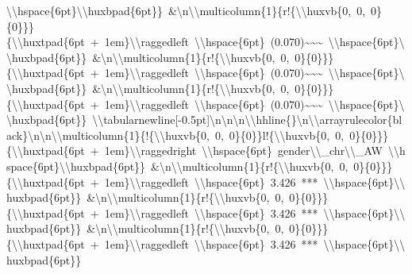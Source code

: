 \documentclass[
  english,
  man]{apa6}
\begin{document}
\textbackslash{}\textbackslash{}hspace\{6pt\}\textbackslash{}\textbackslash{}huxbpad\{6pt\}\}\ \&\textbackslash{}n\textbackslash{}\textbackslash{}multicolumn\{1\}\{r!\{\textbackslash{}\textbackslash{}huxvb\{0,\ 0,\ 0\}\{0\}\}\}\{\textbackslash{}\textbackslash{}huxtpad\{6pt\ +\ 1em\}\textbackslash{}\textbackslash{}raggedleft\ \textbackslash{}\textbackslash{}hspace\{6pt\}\ (0.070)\textasciitilde{}\textasciitilde{}\textasciitilde{}\ \textbackslash{}\textbackslash{}hspace\{6pt\}\textbackslash{}\textbackslash{}huxbpad\{6pt\}\}\ \&\textbackslash{}n\textbackslash{}\textbackslash{}multicolumn\{1\}\{r!\{\textbackslash{}\textbackslash{}huxvb\{0,\ 0,\ 0\}\{0\}\}\}\{\textbackslash{}\textbackslash{}huxtpad\{6pt\ +\ 1em\}\textbackslash{}\textbackslash{}raggedleft\ \textbackslash{}\textbackslash{}hspace\{6pt\}\ (0.070)\textasciitilde{}\textasciitilde{}\textasciitilde{}\ \textbackslash{}\textbackslash{}hspace\{6pt\}\textbackslash{}\textbackslash{}huxbpad\{6pt\}\}\ \&\textbackslash{}n\textbackslash{}\textbackslash{}multicolumn\{1\}\{r!\{\textbackslash{}\textbackslash{}huxvb\{0,\ 0,\ 0\}\{0\}\}\}\{\textbackslash{}\textbackslash{}huxtpad\{6pt\ +\ 1em\}\textbackslash{}\textbackslash{}raggedleft\ \textbackslash{}\textbackslash{}hspace\{6pt\}\ (0.070)\textasciitilde{}\textasciitilde{}\textasciitilde{}\ \textbackslash{}\textbackslash{}hspace\{6pt\}\textbackslash{}\textbackslash{}huxbpad\{6pt\}\}\ \textbackslash{}\textbackslash{}tabularnewline{[}-0.5pt{]}\textbackslash{}n\textbackslash{}n\textbackslash{}n\textbackslash{}\textbackslash{}hhline\{\}\textbackslash{}n\textbackslash{}\textbackslash{}arrayrulecolor\{black\}\textbackslash{}n\textbackslash{}n\textbackslash{}\textbackslash{}multicolumn\{1\}\{!\{\textbackslash{}\textbackslash{}huxvb\{0,\ 0,\ 0\}\{0\}\}l!\{\textbackslash{}\textbackslash{}huxvb\{0,\ 0,\ 0\}\{0\}\}\}\{\textbackslash{}\textbackslash{}huxtpad\{6pt\ +\ 1em\}\textbackslash{}\textbackslash{}raggedright\ \textbackslash{}\textbackslash{}hspace\{6pt\}\ gender\textbackslash{}\textbackslash{}\_chr\textbackslash{}\textbackslash{}\_AW\ \textbackslash{}\textbackslash{}hspace\{6pt\}\textbackslash{}\textbackslash{}huxbpad\{6pt\}\}\ \&\textbackslash{}n\textbackslash{}\textbackslash{}multicolumn\{1\}\{r!\{\textbackslash{}\textbackslash{}huxvb\{0,\ 0,\ 0\}\{0\}\}\}\{\textbackslash{}\textbackslash{}huxtpad\{6pt\ +\ 1em\}\textbackslash{}\textbackslash{}raggedleft\ \textbackslash{}\textbackslash{}hspace\{6pt\}\ 3.426\ ***\ \textbackslash{}\textbackslash{}hspace\{6pt\}\textbackslash{}\textbackslash{}huxbpad\{6pt\}\}\ \&\textbackslash{}n\textbackslash{}\textbackslash{}multicolumn\{1\}\{r!\{\textbackslash{}\textbackslash{}huxvb\{0,\ 0,\ 0\}\{0\}\}\}\{\textbackslash{}\textbackslash{}huxtpad\{6pt\ +\ 1em\}\textbackslash{}\textbackslash{}raggedleft\ \textbackslash{}\textbackslash{}hspace\{6pt\}\ 3.426\ ***\ \textbackslash{}\textbackslash{}hspace\{6pt\}\textbackslash{}\textbackslash{}huxbpad\{6pt\}\}\ \&\textbackslash{}n\textbackslash{}\textbackslash{}multicolumn\{1\}\{r!\{\textbackslash{}\textbackslash{}huxvb\{0,\ 0,\ 0\}\{0\}\}\}\{\textbackslash{}\textbackslash{}huxtpad\{6pt\ +\ 1em\}\textbackslash{}\textbackslash{}raggedleft\ \textbackslash{}\textbackslash{}hspace\{6pt\}\ 3.426\ ***\ \textbackslash{}\textbackslash{}hspace\{6pt\}\textbackslash{}\textbackslash{}huxbpad\{6pt\}\}\ 
\end{document}
